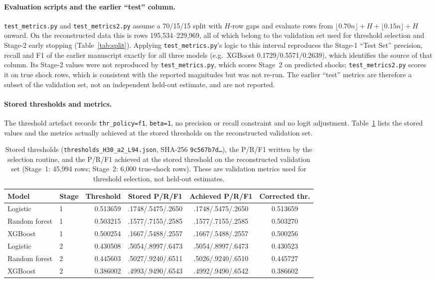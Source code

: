 \documentclass[10pt,a4paper]{article}
\begin{document}
\paragraph{Evaluation scripts and the earlier ``test'' column.} \texttt{test\_metrics.py} and \texttt{test\_metrics2.py} assume a 70/15/15 split with $H$-row gaps and evaluate rows from $\lfloor0.70n\rfloor+H+\lfloor0.15n\rfloor+H$ onward. On the reconstructed data this is rows 195,534--229,969, all of which belong to the validation set used for threshold selection and Stage-2 early stopping (Table~\ref{tab:split}). Applying \texttt{test\_metrics.py}'s logic to this interval reproduces the Stage-1 ``Test Set'' precision, recall and F1 of the earlier manuscript exactly for all three models (e.g.\ XGBoost 0.1729/0.5571/0.2639), which identifies the source of that column. Its Stage-2 values were not reproduced by \texttt{test\_metrics.py}, which scores Stage~2 on predicted shocks; \texttt{test\_metrics2.py} scores it on true shock rows, which is consistent with the reported magnitudes but was not re-run. The earlier ``test'' metrics are therefore a subset of the validation set, not an independent held-out estimate, and are not reported.

\paragraph{Stored thresholds and metrics.} The threshold artefact records \texttt{thr\_policy=f1}, \texttt{beta=1}, no precision or recall constraint and no logit adjustment. Table~\ref{tab:thr} lists the stored values and the metrics actually achieved at the stored thresholds on the reconstructed validation set.

\begin{table}[h]
\centering\small
\caption{Stored thresholds (\texttt{thresholds\_H30\_a2\_L94.json}, SHA-256 \texttt{9c567b7d\ldots}), the P/R/F1 written by the selection routine, and the P/R/F1 achieved at the stored threshold on the reconstructed validation set (Stage~1: 45,994 rows; Stage~2: 6,000 true-shock rows). These are validation metrics used for threshold selection, not held-out estimates.}\label{tab:thr}
\begin{tabular}{llrccc}
\toprule
Model & Stage & Threshold & Stored P/R/F1 & Achieved P/R/F1 & Corrected thr. \\
\midrule
Logistic & 1 & 0.513659 & .1748/.5475/.2650 & .1748/.5475/.2650 & 0.513659 \\
Random forest & 1 & 0.503215 & .1577/.7155/.2585 & .1577/.7155/.2585 & 0.503270 \\
XGBoost & 1 & 0.500254 & .1667/.5488/.2557 & .1667/.5488/.2557 & 0.500256 \\
Logistic & 2 & 0.430508 & .5054/.8997/.6473 & .5054/.8997/.6473 & 0.430523 \\
Random forest & 2 & 0.445603 & .5027/.9240/.6511 & .5026/.9240/.6510 & 0.445727 \\
XGBoost & 2 & 0.386002 & .4993/.9490/.6543 & .4992/.9490/.6542 & 0.386602 \\
\bottomrule
\end{tabular}
\end{table}
\end{document}
